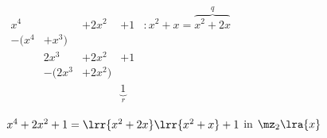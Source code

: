 			$\begin{array}{rrlrl}
				x^4		&		&+2x^2	&+1		&:x^2+x=\overbrace{x^2+2x}^{q}\\
				-(x^4	&+x^3)			&\\
						&2x^3	&+2x^2	&+1\\
						&-(2x^3	&+2x^2)	&\\
						&		&		&\underbrace{1}_{r}
			\end{array}$
			
			$x^4+2x^2+1 =\lrr{x^2+2x}\lrr{x^2+x}+1$ in $\mz_2\lra{x}$
	\subExEnd